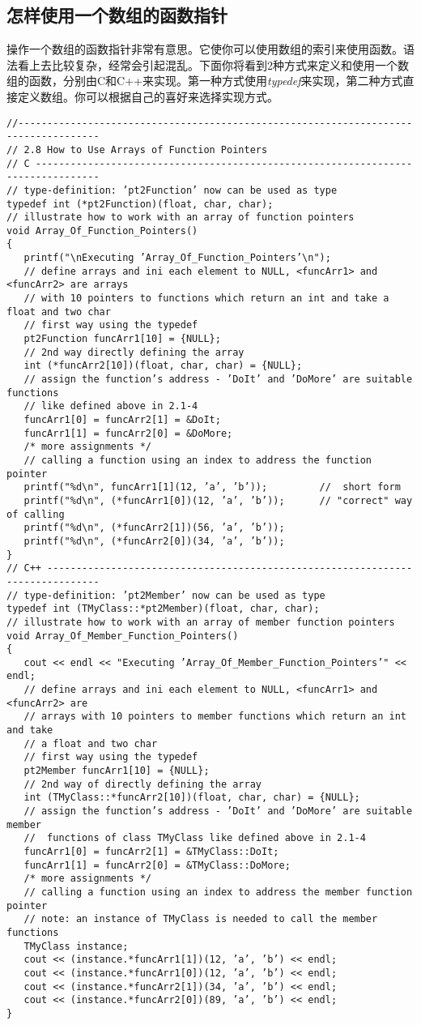 \documentclass[11pt,a4paper]{article}
\begin{document}
\subsection{怎样使用一个数组的函数指针}
操作一个数组的函数指针非常有意思。它使你可以使用数组的索引来使用函数。语法看上去比较复杂，经常会引起混乱。下面你将看到2种方式来定义和使用一个数组的函数，分别由C和C++来实现。第一种方式使用\textit{typedef}来实现，第二种方式直接定义数组。你可以根据自己的喜好来选择实现方式。
\begin{lstlisting}
//------------------------------------------------------------------------------------
// 2.8 How to Use Arrays of Function Pointers
// C ---------------------------------------------------------------------------------
// type-definition: ’pt2Function’ now can be used as type
typedef int (*pt2Function)(float, char, char);
// illustrate how to work with an array of function pointers
void Array_Of_Function_Pointers()
{
   printf("\nExecuting ’Array_Of_Function_Pointers’\n");
   // define arrays and ini each element to NULL, <funcArr1> and <funcArr2> are arrays
   // with 10 pointers to functions which return an int and take a float and two char
   // first way using the typedef
   pt2Function funcArr1[10] = {NULL};
   // 2nd way directly defining the array
   int (*funcArr2[10])(float, char, char) = {NULL};
   // assign the function’s address - ’DoIt’ and ’DoMore’ are suitable functions
   // like defined above in 2.1-4
   funcArr1[0] = funcArr2[1] = &DoIt;
   funcArr1[1] = funcArr2[0] = &DoMore;
   /* more assignments */
   // calling a function using an index to address the function pointer
   printf("%d\n", funcArr1[1](12, ’a’, ’b’));         //  short form
   printf("%d\n", (*funcArr1[0])(12, ’a’, ’b’));      // "correct" way of calling
   printf("%d\n", (*funcArr2[1])(56, ’a’, ’b’));
   printf("%d\n", (*funcArr2[0])(34, ’a’, ’b’));
}
// C++ -------------------------------------------------------------------------------
// type-definition: ’pt2Member’ now can be used as type
typedef int (TMyClass::*pt2Member)(float, char, char);
// illustrate how to work with an array of member function pointers
void Array_Of_Member_Function_Pointers()
{
   cout << endl << "Executing ’Array_Of_Member_Function_Pointers’" << endl;
   // define arrays and ini each element to NULL, <funcArr1> and <funcArr2> are
   // arrays with 10 pointers to member functions which return an int and take
   // a float and two char
   // first way using the typedef
   pt2Member funcArr1[10] = {NULL};
   // 2nd way of directly defining the array
   int (TMyClass::*funcArr2[10])(float, char, char) = {NULL};
   // assign the function’s address - ’DoIt’ and ’DoMore’ are suitable member
   //  functions of class TMyClass like defined above in 2.1-4
   funcArr1[0] = funcArr2[1] = &TMyClass::DoIt;
   funcArr1[1] = funcArr2[0] = &TMyClass::DoMore;
   /* more assignments */
   // calling a function using an index to address the member function pointer
   // note: an instance of TMyClass is needed to call the member functions
   TMyClass instance;
   cout << (instance.*funcArr1[1])(12, ’a’, ’b’) << endl;
   cout << (instance.*funcArr1[0])(12, ’a’, ’b’) << endl;
   cout << (instance.*funcArr2[1])(34, ’a’, ’b’) << endl;
   cout << (instance.*funcArr2[0])(89, ’a’, ’b’) << endl;
}
\end{lstlisting}
\end{document}
